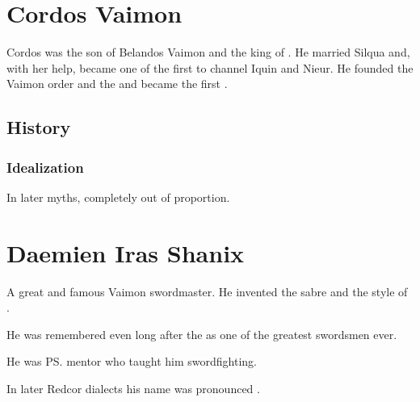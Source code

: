 \section{Cordos Vaimon}
Cordos was the son of Belandos Vaimon and the king of \Imrath{}. 
He married Silqua \Delaen and, with her help, became one of the first \humans{} to channel Iquin and Nieur. 
He founded the Vaimon order and the \VaimonCaliphate and became the first \VaimonCaliph. 









\subsection{History}





\subsubsection{Idealization}
In later myths,  completely out of proportion.















\section{Daemien Iras Shanix}
A great and famous Vaimon swordmaster. 
He invented the  sabre and the style of . 

He was remembered even long after the \Darkfall{} as one of the greatest swordsmen ever. 

He was \ps{\VizicarDurasRespina} mentor who taught him swordfighting. 

In later Redcor dialects his name was pronounced \DamianChanici. 















